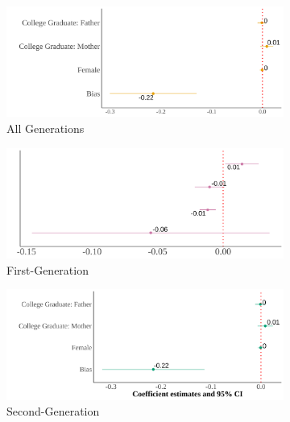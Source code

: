 \begin{center}
\begin{figure}[!htb]
\centering
\caption{Relationship Between Self-Reported Asian Identity and Bias: By Generation at the County Level}
\label{plot01-regression-gen-county}
\begin{subfigure}{.48\textwidth}
\caption{All Generations}
\centering
\includegraphics[width=.9\linewidth]{county-by-parents-regs-all.png}
\end{subfigure}
\centering
\begin{subfigure}{.48\textwidth}
\caption{First-Generation}
\centering
\includegraphics[width=.9\linewidth]{county-skin-iat-regression-first-gen.png}
\end{subfigure}
\begin{subfigure}{.48\textwidth}
\caption{Second-Generation}
\centering
\includegraphics[width=.9\linewidth]{county-skin-iat-regression-second-gen.png}
\end{subfigure}
\begin{subfigure}{.48\textwidth}

\end{subfigure}
\end{figure}
\end{center}
